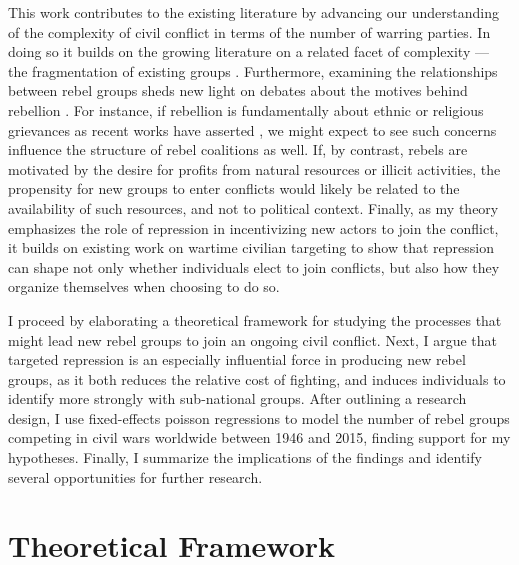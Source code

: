 \documentclass[12pt,]{book}
\begin{document}
This work contributes to the existing literature by advancing our
understanding of the complexity of civil conflict in terms of the number
of warring parties. In doing so it builds on the growing literature on a
related facet of complexity --- the fragmentation of existing groups
\citep[see][]{Cunningham2009, Pearlman2011a, Staniland2014}.
Furthermore, examining the relationships between rebel groups sheds new
light on debates about the motives behind rebellion
\citep[e.g.][]{Collier2004}. For instance, if rebellion is fundamentally
about ethnic or religious grievances as recent works have asserted
\citep{Cederman2010}, we might expect to see such concerns influence the
structure of rebel coalitions as well. If, by contrast, rebels are
motivated by the desire for profits from natural resources or illicit
activities, the propensity for new groups to enter conflicts would
likely be related to the availability of such resources, and not to
political context. Finally, as my theory emphasizes the role of
repression in incentivizing new actors to join the conflict, it builds
on existing work on wartime civilian targeting
\citep[e.g.][]{Kalyvas2006} to show that repression can shape not only
whether individuals elect to join conflicts, but also how they organize
themselves when choosing to do so.

I proceed by elaborating a theoretical framework for studying the
processes that might lead new rebel groups to join an ongoing civil
conflict. Next, I argue that targeted repression is an especially
influential force in producing new rebel groups, as it both reduces the
relative cost of fighting, and induces individuals to identify more
strongly with sub-national groups. After outlining a research design, I
use fixed-effects poisson regressions to model the number of rebel
groups competing in civil wars worldwide between 1946 and 2015, finding
support for my hypotheses. Finally, I summarize the implications of the
findings and identify several opportunities for further research.

\section{Theoretical Framework}\label{theoretical-framework}
\end{document}
